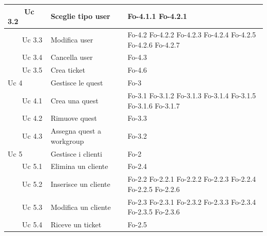 \documentclass[10pt,a4paper]{article}
\begin{document}
\begin{longtable}{|p{3.5cm}|p{6.5cm}|p{3cm}|}
\hline
\ \ \ \ Uc 3.2 & Sceglie tipo user & Fo-4.1.1 \newline Fo-4.2.1\\
\hline
\ \ \ \ Uc 3.3 & Modifica user & Fo-4.2 \newline Fo-4.2.2 \newline Fo-4.2.3 \newline Fo-4.2.4 \newline Fo-4.2.5 \newline Fo-4.2.6 \newline Fo-4.2.7\\
\hline
\ \ \ \ Uc 3.4 & Cancella user & Fo-4.3\\
\hline
\ \ \ \ Uc 3.5 & Crea ticket & Fo-4.6\\
\hline
Uc 4 & Gestisce le quest & Fo-3\\
\hline
\ \ \ \ Uc 4.1 & Crea una quest & Fo-3.1 \newline Fo-3.1.2 \newline Fo-3.1.3 \newline Fo-3.1.4 \newline Fo-3.1.5 \newline Fo-3.1.6 \newline Fo-3.1.7\\
\hline
\ \ \ \ Uc 4.2 & Rimuove quest & Fo-3.3\\
\hline
\ \ \ \ Uc 4.3 & Assegna quest a workgroup & Fo-3.2\\
\hline
Uc 5 & Gestisce i clienti & Fo-2\\
\hline
\ \ \ \ Uc 5.1 & Elimina un cliente & Fo-2.4\\
\hline
\ \ \ \ Uc 5.2 & Inserisce un cliente & Fo-2.2 \newline Fo-2.2.1 \newline Fo-2.2.2 \newline Fo-2.2.3 \newline Fo-2.2.4 \newline Fo-2.2.5 \newline Fo-2.2.6\\
\hline
\ \ \ \ Uc 5.3 & Modifica un cliente & Fo-2.3 \newline Fo-2.3.1 \newline Fo-2.3.2 \newline Fo-2.3.3 \newline Fo-2.3.4 \newline Fo-2.3.5 \newline Fo-2.3.6 \\
\hline
\ \ \ \ Uc 5.4 & Riceve un ticket & Fo-2.5\\

\end{longtable}
\end{document}
